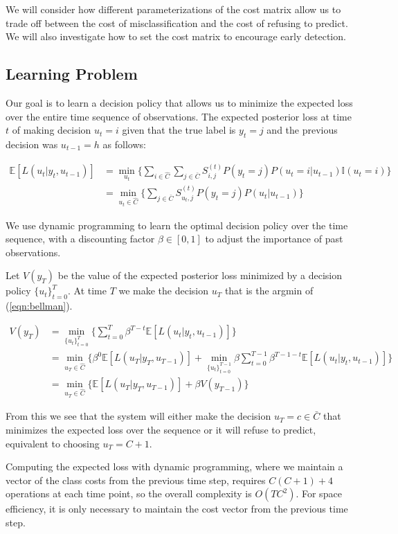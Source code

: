 \documentclass[12pt,solutions]{article}
\newcommand{\I}{\mathbb{I}}
\newcommand{\E}{\mathbb{E}}
\begin{document}
We will consider how different parameterizations of the cost matrix allow us to trade off between the cost of misclassification and the cost of refusing to predict. We will also investigate how to set the cost matrix to encourage early detection.

\subsection{Learning Problem}
Our goal is to learn a decision policy that allows us to minimize the expected loss over the entire time sequence of observations.
The expected posterior loss at time $t$ of making decision $u_t=i$ given that the true label is $y_t=j$ and the previous decision was $u_{t-1}=h$ as follows:

\begin{align}
\E[L(u_t|y_t, u_{t-1})] &= \min_{u_t} \Big\{ \sum_{i \in \hat{C}} \sum_{j \in \bar{C}} S_{i,j}^{(t)} P(y_t=j)P(u_t=i|u_{t-1})\I(u_t=i)\Big\}\\
&= \min_{u_t \in \hat{C}} \Big\{ \sum_{j \in \bar{C}} S_{u_t,j}^{(t)} P(y_t=j)P(u_t|u_{t-1})\Big\}
\label{eqn:exploss}
\end{align}

We use dynamic programming to learn the optimal decision policy over the time sequence, with a discounting factor $\beta \in [0,1]$ to adjust the importance of past observations.

Let $V(y_T)$ be the value of the expected posterior loss minimized by a decision policy $\{u_t\}_{t=0}^{T}$. At time $T$ we make the decision $u_T$ that is the argmin of (\ref{eqn:bellman}).

\begin{align}
V(y_T) &= \min_{\{u_t\}_{t=0}^{T}} \Big\{ \sum_{t=0}^T \beta^{T-t}\E[L(u_t|y_t, u_{t-1})] \Big\}\\
&= \min_{u_T \in \hat{C}} \Big\{  \beta^{0}\E[L(u_T|y_T, u_{T-1})] + \min_{\{u_t\}_{t=0}^{T-1}} \beta \sum_{t=0}^{T-1} \beta^{T-1-t}\E[L(u_t|y_t, u_{t-1})] \Big\}\\
&= \min_{u_T \in \hat{C}} \Big\{  \E[L(u_T|y_T, u_{T-1})] + \beta V(y_{T-1})\Big\} \label{eqn:bellman}
\end{align}

From this we see that the system will either make the decision $u_T = c \in \bar{C}$ that minimizes the expected loss over the sequence or it will refuse to predict, equivalent to choosing $u_T = C+1$. 

Computing the expected loss with dynamic programming, where we maintain a vector of the class costs from the previous time step, requires $C(C+1)+4$ operations at each time point, so the overall complexity is $O(TC^2)$. For space efficiency, it is only necessary to maintain the cost vector from the previous time step.
\end{document}

